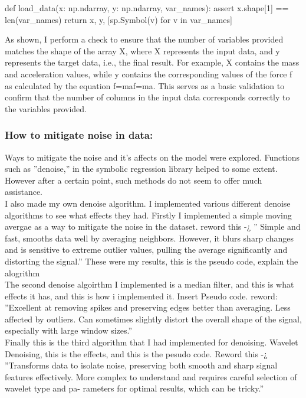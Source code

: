 \documentclass{article}
\begin{document}
def load_data(x: np.ndarray, y: np.ndarray, var_names):
    assert x.shape[1] == len(var_names)
    return x, y, [sp.Symbol(v) for v in var_names]



As shown, I perform a check to ensure that the number of variables provided matches the shape of the array X, where X represents the input data, and y represents the target data, i.e., the final result. For example, X contains the mass and acceleration values, while y contains the corresponding values of the force f as calculated by the equation f=maf=ma. This serves as a basic validation to confirm that the number of columns in the input data corresponds correctly to the variables provided.\\

\subsubsection{How to mitigate noise in data: }

Ways to mitigate the noise and it’s affects on the model were explored. Functions such as ”denoise,” in the
symbolic regression library helped to some extent. However after a certain point, such methods do not seem to
offer much assistance.\\
I also made my own denoise algorithm. I implemented various different denoise algorithms to see what effects
they had. Firstly I implemented a simple moving avergae as a way to mitigate the noise in the dataset. reword
this -¿ ” Simple and fast, smooths data well by averaging neighbors. However, it blurs sharp changes and is
sensitive to extreme outlier values, pulling the average significantly and distorting the signal.”
These were my results, this is the pseudo code, explain the alogrithm\\

The second denoise algoirthm I implemented is a median filter, and this is what effects it has, and this is how
i implemented it. Insert Pseudo code. reword: ”Excellent at removing spikes and preserving edges better than
averaging. Less affected by outliers. Can sometimes slightly distort the overall shape of the signal, especially
with large window sizes.”\\

Finally this is the third algorithm that I had implemented for denoising. Wavelet Denoising, this is the effects,
and this is the pesudo code. Reword this -¿ ”Transforms data to isolate noise, preserving both smooth and sharp
signal features effectively. More complex to understand and requires careful selection of wavelet type and pa-
rameters for optimal results, which can be tricky.”\\
\end{document}
